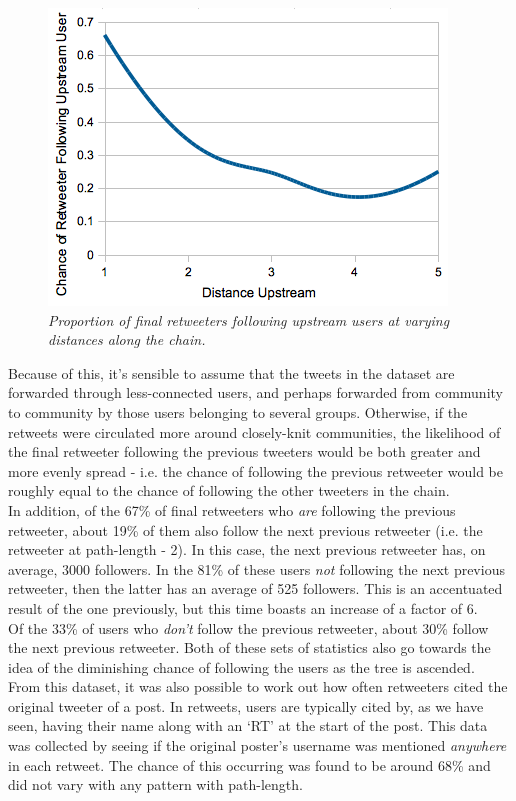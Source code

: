 \begin{figure}[h]
\includegraphics[scale=0.55]{3.Chapter1/Media/following-possibility.png} 
\caption{\textit{Proportion of final retweeters following upstream users at varying distances along the chain.}}
\label{fig:following-possibility}
\end{figure}
Because of this, it's sensible to assume that the tweets in the dataset are forwarded through less-connected users, and perhaps forwarded from community to community by those users belonging to several groups. Otherwise, if the retweets were circulated more around closely-knit communities, the likelihood of the final retweeter following the previous tweeters would be both greater and more evenly spread - i.e. the chance of following the previous retweeter would be roughly equal to the chance of following the other tweeters in the chain.\\
In addition, of the 67\% of final retweeters who \textit{are} following the previous retweeter, about 19\% of them also follow the next previous retweeter (i.e. the retweeter at path-length - 2). In this case, the next previous retweeter has, on average, 3000 followers. In the 81\% of these users \textit{not} following the next previous retweeter, then the latter has an average of 525 followers. This is an accentuated result of the one previously, but this time boasts an increase of a factor of 6.\\
Of the 33\% of users who \textit{don't} follow the previous retweeter, about 30\% follow the next previous retweeter. Both of these sets of statistics also go towards the idea of the diminishing chance of following the users as the tree is ascended.\\
From this dataset, it was also possible to work out how often retweeters cited the original tweeter of a post. In retweets, users are typically cited by, as we have seen, having their name along with an `RT' at the start of the post. This data was collected by seeing if the original poster's username was mentioned \textit{anywhere} in each retweet. The chance of this occurring was found to be around 68\% and did not vary with any pattern with path-length.
 

